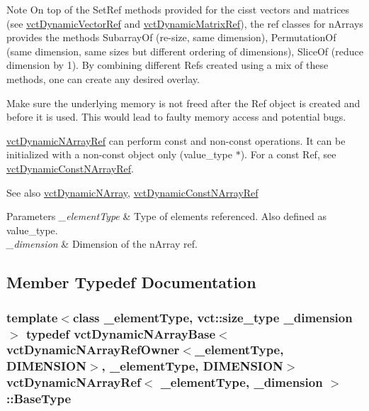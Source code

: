 \begin{DoxyNote}{Note}
On top of the Set\+Ref methods provided for the cisst vectors and matrices (see \hyperlink{classvct_dynamic_vector_ref}{vct\+Dynamic\+Vector\+Ref} and \hyperlink{classvct_dynamic_matrix_ref}{vct\+Dynamic\+Matrix\+Ref}), the ref classes for n\+Arrays provides the methods Subarray\+Of (re-\/size, same dimension), Permutation\+Of (same dimension, same sizes but different ordering of dimensions), Slice\+Of (reduce dimension by 1). By combining different Refs created using a mix of these methods, one can create any desired overlay.

Make sure the underlying memory is not freed after the Ref object is created and before it is used. This would lead to faulty memory access and potential bugs.

\hyperlink{classvct_dynamic_n_array_ref}{vct\+Dynamic\+N\+Array\+Ref} can perform const and non-\/const operations. It can be initialized with a non-\/const object only ({\ttfamily value\+\_\+type $\ast$}). For a const Ref, see \hyperlink{classvct_dynamic_const_n_array_ref}{vct\+Dynamic\+Const\+N\+Array\+Ref}.
\end{DoxyNote}
\begin{DoxySeeAlso}{See also}
\hyperlink{classvct_dynamic_n_array}{vct\+Dynamic\+N\+Array}, \hyperlink{classvct_dynamic_const_n_array_ref}{vct\+Dynamic\+Const\+N\+Array\+Ref}
\end{DoxySeeAlso}

\begin{DoxyParams}{Parameters}
{\em \+\_\+element\+Type} & Type of elements referenced. Also defined as {\ttfamily value\+\_\+type}.\\
\hline
{\em \+\_\+dimension} & Dimension of the n\+Array ref. \\
\hline
\end{DoxyParams}


\subsection{Member Typedef Documentation}
\hypertarget{classvct_dynamic_n_array_ref_a05a9add95925f07f6bc955f7623f39d0}{}
\subsubsection[{Base\+Type}]{\setlength{\rightskip}{0pt plus 5cm}template$<$class \+\_\+element\+Type, vct\+::size\+\_\+type \+\_\+dimension$>$ typedef {\bf vct\+Dynamic\+N\+Array\+Base}$<${\bf vct\+Dynamic\+N\+Array\+Ref\+Owner}$<$\+\_\+element\+Type, {\bf D\+I\+M\+E\+N\+S\+I\+O\+N}$>$, \+\_\+element\+Type, {\bf D\+I\+M\+E\+N\+S\+I\+O\+N}$>$ {\bf vct\+Dynamic\+N\+Array\+Ref}$<$ \+\_\+element\+Type, \+\_\+dimension $>$\+::{\bf Base\+Type}}\label{classvct_dynamic_n_array_ref_a05a9add95925f07f6bc955f7623f39d0}
\hypertarget{classvct_dynamic_n_array_ref_adcf4caa9e0d51a28f2baebabecc9a38b}{}
